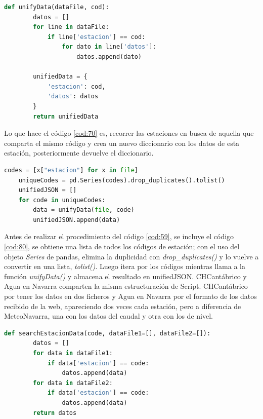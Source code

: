 \begin{lstlisting}[language=Python, caption={Declaración función \textit{unifyData()} para el correcto funcionamiento del formateo de MeteoNavarra}, label=cod:70]
	def unifyData(dataFile, cod):
		datos = []
		for line in dataFile:
			if line['estacion'] == cod:
				for dato in line['datos']:
					datos.append(dato)
		
		unifiedData = {
			'estacion': cod,
			'datos': datos
		}
		return unifiedData
\end{lstlisting}

Lo que hace el código \ref{cod:70} es, recorrer las estaciones en busca de aquella que comparta el mismo código y crea un nuevo diccionario con los datos de esta estación, posteriormente devuelve el diccionario.

\begin{lstlisting}[language=Python, caption={Paso inicial en la función \textit{formatData()} de MeteoNavarra}, label=cod:80]
	codes = [x["estacion"] for x in file]
	uniqueCodes = pd.Series(codes).drop_duplicates().tolist()
	unifiedJSON = []
	for code in uniqueCodes:
		data = unifyData(file, code)
		unifiedJSON.append(data)
\end{lstlisting}

Antes de realizar el procedimiento del código \ref{cod:59}, se incluye el código \ref{cod:80}, se obtiene una lista de todos los códigos de estación; con el uso del objeto \textit{Series} de pandas, elimina la duplicidad con \textit{drop\_duplicates()} y lo vuelve a convertir en una lista, \textit{tolist()}. Luego itera por los códigos mientras llama a la función \textit{unifyData()} y almacena el resultado en unifiedJSON.\newline
\newline
CHCantábrico y Agua en Navarra comparten la misma estructuración de Script. CHCantábrico por tener los datos en dos ficheros y Agua en Navarra por el formato de los datos recibido de la web, apareciendo dos veces cada estación, pero a diferencia de MeteoNavarra, una con los datos del caudal y otra con los de nivel.

\begin{lstlisting}[language=Python, caption={Declaración función \textit{searchEstacionData()}, especifica en el formateo de datos de CHCantábrico y Agua en Navarra}, label=cod:90]
	def searchEstacionData(code, dataFile1=[], dataFile2=[]):
		datos = []
		for data in dataFile1:
			if data['estacion'] == code:
				datos.append(data)
		for data in dataFile2:
			if data['estacion'] == code:
				datos.append(data)
		return datos
\end{lstlisting}

